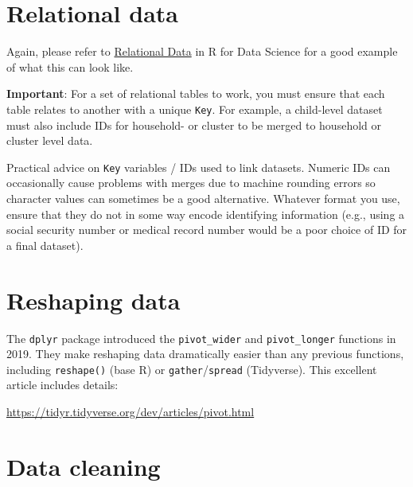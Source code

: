 \documentclass[]{book}
\begin{document}
\hypertarget{relational-data}{%
\section{Relational data}\label{relational-data}}

Again, please refer to \href{https://r4ds.had.co.nz/relational-data.html}{Relational Data} in R for Data Science for a good example of what this can look like.

\textbf{Important}: For a set of relational tables to work, you must ensure that each table relates to another with a unique \texttt{Key}. For example, a child-level dataset must also include IDs for household- or cluster to be merged to household or cluster level data.

Practical advice on \texttt{Key} variables / IDs used to link datasets. Numeric IDs can occasionally cause problems with merges due to machine rounding errors so character values can sometimes be a good alternative. Whatever format you use, ensure that they do not in some way encode identifying information (e.g., using a social security number or medical record number would be a poor choice of ID for a final dataset).

\hypertarget{reshaping-data}{%
\section{Reshaping data}\label{reshaping-data}}

The \texttt{dplyr} package introduced the \texttt{pivot\_wider} and \texttt{pivot\_longer} functions in 2019. They make reshaping data dramatically easier than any previous functions, including \texttt{reshape()} (base R) or \texttt{gather}/\texttt{spread} (Tidyverse). This excellent article includes details:

\url{https://tidyr.tidyverse.org/dev/articles/pivot.html}

\hypertarget{data-cleaning}{%
\section{Data cleaning}\label{data-cleaning}}
\end{document}
